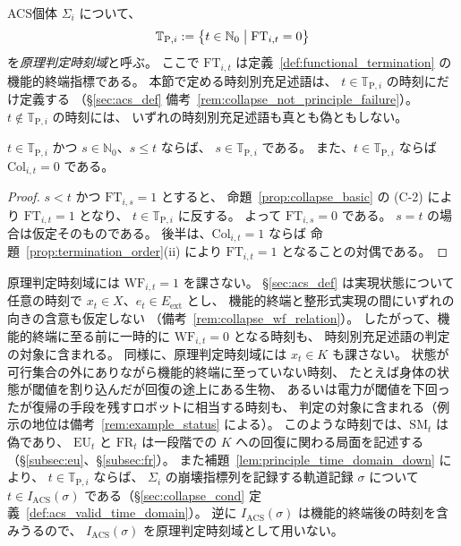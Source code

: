 \begin{definition}[原理判定時刻域]
\label{def:principle_time_domain}
ACS個体 $\Sigma_i$ について、
\[
  \mathbb{T}_{\mathrm{P},i}
  :=
  \bigl\{
    t\in\mathbb{N}_0
    \bigm|
    \mathrm{FT}_{i,t}=0
  \bigr\}
\]
を\emph{原理判定時刻域}と呼ぶ。
ここで $\mathrm{FT}_{i,t}$ は定義~\ref{def:functional_termination} の機能的終端指標である。
本節で定める時刻別充足述語は、
$t\in\mathbb{T}_{\mathrm{P},i}$ の時刻にだけ定義する
（\S\ref{sec:acs_def} 備考~\ref{rem:collapse_not_principle_failure}）。
$t\notin\mathbb{T}_{\mathrm{P},i}$ の時刻には、
いずれの時刻別充足述語も真とも偽ともしない。
\end{definition}

\begin{lemma}[原理判定時刻域の下方閉性]
\label{lem:principle_time_domain_down}
$t\in\mathbb{T}_{\mathrm{P},i}$ かつ $s\in\mathbb{N}_0$、$s\le t$ ならば、
$s\in\mathbb{T}_{\mathrm{P},i}$ である。
また、$t\in\mathbb{T}_{\mathrm{P},i}$ ならば $\mathrm{Col}_{i,t}=0$ である。
\end{lemma}

\begin{proof}
$s<t$ かつ $\mathrm{FT}_{i,s}=1$ とすると、
命題~\ref{prop:collapse_basic} の (C-2) により $\mathrm{FT}_{i,t}=1$ となり、
$t\in\mathbb{T}_{\mathrm{P},i}$ に反する。
よって $\mathrm{FT}_{i,s}=0$ である。
$s=t$ の場合は仮定そのものである。
後半は、$\mathrm{Col}_{i,t}=1$ ならば
命題~\ref{prop:termination_order}(ii) により $\mathrm{FT}_{i,t}=1$ となることの対偶である。
\end{proof}

\begin{remark}
\label{rem:principle_time_domain_scope}
原理判定時刻域には $\mathrm{WF}_{i,t}=1$ を課さない。
\S\ref{sec:acs_def} は実現状態について任意の時刻で
$x_t\in X$、$e_t\in E_{\mathrm{ext}}$ とし、
機能的終端と整形式実現の間にいずれの向きの含意も仮定しない
（備考~\ref{rem:collapse_wf_relation}）。
したがって、機能的終端に至る前に一時的に $\mathrm{WF}_{i,t}=0$ となる時刻も、
時刻別充足述語の判定の対象に含まれる。
同様に、原理判定時刻域には $x_t\in K$ も課さない。
状態が可行集合の外にありながら機能的終端に至っていない時刻、
たとえば身体の状態が閾値を割り込んだが回復の途上にある生物、
あるいは電力が閾値を下回ったが復帰の手段を残すロボットに相当する時刻も、
判定の対象に含まれる（例示の地位は備考~\ref{rem:example_status} による）。
このような時刻では、$\mathrm{SM}_t$ は偽であり、
$\mathrm{EU}_t$ と $\mathrm{FR}_t$ は一段階での $K$ への回復に関わる局面を記述する
（\S\ref{subsec:eu}、\S\ref{subsec:fr}）。
また補題~\ref{lem:principle_time_domain_down} により、
$t\in\mathbb{T}_{\mathrm{P},i}$ ならば、
$\Sigma_i$ の崩壊指標列を記録する軌道記録 $\sigma$ について
$t\in I_{\mathrm{ACS}}(\sigma)$ である（\S\ref{sec:collapse_cond} 定義~\ref{def:acs_valid_time_domain}）。
逆に $I_{\mathrm{ACS}}(\sigma)$ は機能的終端後の時刻を含みうるので、
$I_{\mathrm{ACS}}(\sigma)$ を原理判定時刻域として用いない。
\end{remark}

